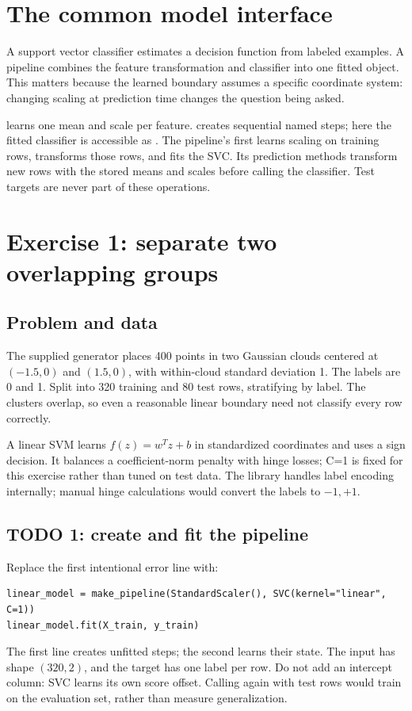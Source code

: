 

\section*{The common model interface}
A support vector classifier estimates a decision function from labeled examples. A pipeline combines the
feature transformation and classifier into one fitted object. This matters because the learned boundary
assumes a specific coordinate system: changing scaling at prediction time changes the question being asked.

 learns one mean and scale per feature.  creates sequential named steps;
here the fitted classifier is accessible as .
The pipeline's  first learns scaling on training rows, transforms those rows, and fits the SVC.
Its prediction methods transform new rows with the stored means and scales before calling the classifier.
Test targets are never part of these operations.

\section{Exercise 1: separate two overlapping groups}
\subsection{Problem and data}
The supplied generator places 400 points in two Gaussian clouds centered at $(-1.5,0)$ and $(1.5,0)$,
with within-cloud standard deviation 1. The labels are 0 and 1. Split into 320 training and 80 test rows,
stratifying by label. The clusters overlap, so even a reasonable linear boundary need not classify every row correctly.

A linear SVM learns $f(z)=w^Tz+b$ in standardized coordinates and uses a sign decision.
It balances a coefficient-norm penalty with hinge losses; C=1 is fixed for this exercise rather than tuned on test data.
The library handles label encoding internally; manual hinge calculations would convert the labels to $-1,+1$.

\subsection{TODO 1: create and fit the pipeline}
Replace the first intentional error line with:
\begin{lstlisting}
linear_model = make_pipeline(StandardScaler(), SVC(kernel="linear", C=1))
linear_model.fit(X_train, y_train)
\end{lstlisting}
The first line creates unfitted steps; the second learns their state. The input has shape $(320,2)$,
and the target has one label per row. Do not add an intercept column: SVC learns its own score offset.
Calling  again with test rows would train on the evaluation set, rather than measure generalization.

